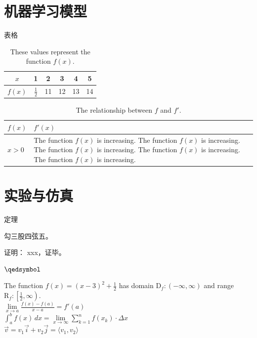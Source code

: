 \documentclass{beamer}%
\begin{document}
    \section{机器学习模型}
\begin{frame}{表格}

\begin{table}[H]
	\centering
	\def\arraystretch{1.5}
	\begin{tabular}{|c||c|c|c|c|c|}
		\hline
		$x$ & 1 & 2 & 3 & 4 & 5 \\ \hline
		$f(x)$ & $\frac{1}{2}$ & 11 & 12 & 13 & 14 \\ \hline
	\end{tabular}
	\caption{These values represent the function $f(x)$.}
\end{table}


\begin{table}[H]
	\centering
	\caption{The relationship between $f$ and $f'$.}
	\def\arraystretch{1.5}
	\begin{tabular}{|l|p{3in}|}
		\hline
		$f(x)$ & $f'(x)$ \\ \hline
		$x>0$ & The function $f(x)$ is increasing. The function $f(x)$ is increasing. The function $f(x)$ is increasing. The function $f(x)$ is increasing. The function $f(x)$ is increasing. \\ \hline
	\end{tabular}
\end{table}

\end{frame}
	
	\section{实验与仿真}
	\begin{frame}{定理}
		\begin{theorem}[勾股定理]
			勾三股四弦五。
		\end{theorem}
	证明：
	xxx，证毕。
	
	$\hfill\qedsymbol$
	
	The function $f(x)=(x-3)^2+\frac{1}{2}$ has domain $\mathrm{D}_f:(-\infty,\infty)$ and range $\mathrm{R}_f:\left[\frac{1}{2},\infty\right)$.\\

	$\displaystyle{\lim \limits_{x \to a} \frac{f(x)-f(a)}{x-a}=f'(a)}$\\
	
	$\displaystyle{\int_a^b f(x) \,dx=\lim \limits_{x \to \infty} \sum \limits_{k=1}^{n} f(x_k) \cdot \Delta x}$\\
	
	$\vec{v}=v_1 \vec{i}+v_2 \vec{j}=\langle v_1, v_2 \rangle$
	\end{frame}
\end{document}
